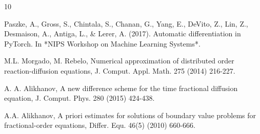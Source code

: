 \documentclass[11pt]{article}
\begin{document}
\begin{thebibliography}{10}
\begin{footnotesize}
Paszke, A., Gross, S., Chintala, S., Chanan, G., Yang, E., DeVito, Z., Lin, Z., Desmaison, A., Antiga, L., \& Lerer, A. (2017). Automatic differentiation in PyTorch. In *NIPS Workshop on Machine Learning Systems*.


 M.L. Morgado,  M. Rebelo,   Numerical approximation of distributed order reaction-diffusion equations, J. Comput. Appl. Math. 275 (2014) 216-227.





  A. A.   Alikhanov,   A new difference scheme for the time fractional diffusion equation, J. Comput. Phys.  280 (2015) 424-438.



A.A. Alikhanov, A priori estimates for solutions of boundary value problems
for fractional-order equations, Differ. Equ. 46(5) (2010) 660-666.
\end{footnotesize}
\end{thebibliography}


\end{document}

